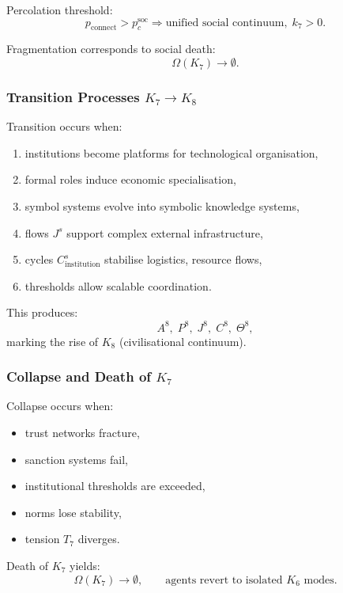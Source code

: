 Percolation threshold:
\[
p_{\text{connect}} > p_c^{\text{soc}} \Rightarrow 
\text{unified social continuum},\; k_7>0.
\]

Fragmentation corresponds to social death:
\[
\Omega(K_7) \to \emptyset.
\]

\subsubsection{Transition Processes \texorpdfstring{$K_7 \to K_8$}{K_7 \to K_8}}

Transition occurs when:
\begin{enumerate}
    \item institutions become platforms for technological organisation,
    \item formal roles induce economic specialisation,
    \item symbol systems evolve into symbolic knowledge systems,
    \item flows $J^s$ support complex external infrastructure,
    \item cycles $C^s_{\text{institution}}$ stabilise logistics, resource flows,
    \item thresholds allow scalable coordination.
\end{enumerate}

This produces:
\[
A^8,\; P^8,\; J^8,\; C^8,\; \Theta^8,
\]
marking the rise of $K_8$ (civilisational continuum).

\subsubsection{Collapse and Death of \texorpdfstring{$K_7$}{K_7}}

Collapse occurs when:
\begin{itemize}
    \item trust networks fracture,
    \item sanction systems fail,
    \item institutional thresholds are exceeded,
    \item norms lose stability,
    \item tension $T_7$ diverges.
\end{itemize}

Death of $K_7$ yields:
\[
\Omega(K_7)\to\emptyset,
\qquad 
\text{agents revert to isolated }K_6\text{ modes}.
\]

